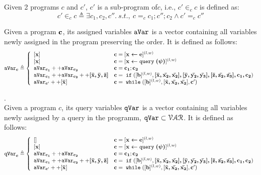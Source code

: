 %
Given 2 programs $c$ and $c'$, $c'$ is a sub-program of$c$, i.e., $c' \in_{c} c$ is defined as:
\begin{equation}
c' \in_{c} c \triangleq \exists c_1, c_2, c''. ~ s.t.,~
c =_{c} c_1; c''; c_2 \land c' =_{c} c''
\end{equation} 
%
\begin{defn}
Given a program ${\boldsymbol{\mathbf{c}}}$, its assigned variables $\mathtt{aVar}$ is a vector containing all variables newly assigned in the program preserving the order. 
It is defined as follows:
$$
  \avar_{\ssa{c}} \triangleq
  \left\{
  \begin{array}{ll}
      [\ssa{x}]                   
      & \ssa{c} = [\ssa{\assign x e}]^{(l, w)} 
      \\
      \left[ \ssa{x} \right]                  
      & \ssa{c} = [\ssa{\assign x \query(\qexpr)}]^{(l, w)} 
      \\
      \avar_{\ssa{c_1}} ++ \avar_{\ssa{c_2}}  
      & \ssa{c} = \ssa{c_1};\ssa{c_2}
      \\
      \avar_{\ssa{c_1}} ++ \avar_{\ssa{c_2}} ++ \ssa{[\bar{x}, \bar{y}, \bar{z}]} 
      & \ssa{c} =\eif([\sbexpr]^{(l, w)} , \ssa{[\bar{x}, \bar{x_2}, \bar{x_2}], 
      [\bar{y}, \bar{y_2}, \bar{y_3}], 
      [\bar{z}, \bar{z_2}, \bar{z_3}], c_1, c_2}) 
      \\
      \avar_{\ssa{c}'} ++ [\ssa{\bar{x}}]
      & \ssa{c}   = \ewhile ([\sbexpr]^{(l, w)}, [\ssa{\bar{x}, \bar{x_2}, \bar{x_2}}], \ssa{c}')
\end{array}
\right.
$$
\end{defn}
%
\begin{defn}.
\\
Given a program $c$, its query variables $\mathtt{qVar}$ is a vector containing all variables newly assigned by a query in the programm, $\mathtt{qVar} \subset \mathcal{VAR}$.
It is defined as follows:
$$
  \qvar_{\ssa{c}} \triangleq
  \left\{
  \begin{array}{ll}
      []                  
      & \ssa{c} = [\ssa{\assign x e}]^{(l, w)} 
      \\
      \left[ \ssa{x} \right]                  
      & \ssa{c} = [\ssa{\assign x \query(\qexpr)}]^{(l, w)} 
      \\
      \avar_{\ssa{c_1}} ++ \avar_{\ssa{c_2}}  
      & \ssa{c} = \ssa{c_1};\ssa{c_2}
      \\
      \avar_{\ssa{c_1}} ++ \avar_{\ssa{c_2}} ++ \ssa{[\bar{x}, \bar{y}, \bar{z}]} 
      & \ssa{c} =\eif([\sbexpr]^{(l, w)} , \ssa{[\bar{x}, \bar{x_2}, \bar{x_2}], 
      [\bar{y}, \bar{y_2}, \bar{y_3}], 
      [\bar{z}, \bar{z_2}, \bar{z_3}], c_1, c_2}) 
      \\
      \avar_{\ssa{c}'} ++ [\ssa{\bar{x}}]
      & \ssa{c}   = \ewhile ([\sbexpr]^{(l, w)}, [\ssa{\bar{x}, \bar{x_2}, \bar{x_2}}], \ssa{c}')
\end{array}
\right.
$$
\end{defn}

